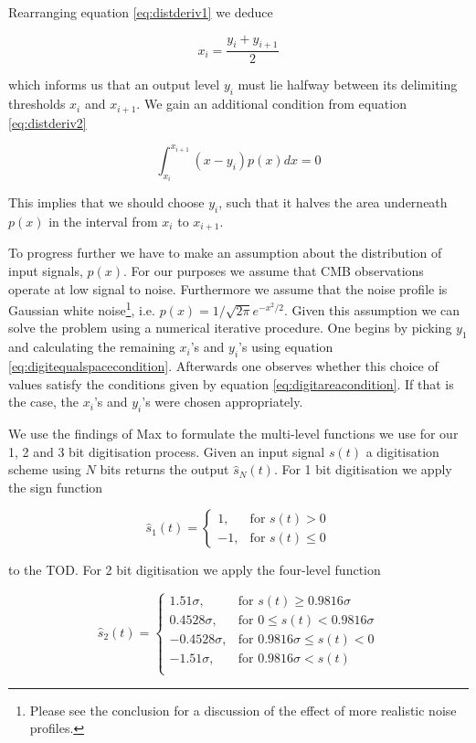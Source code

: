 \documentclass[apj]{emulateapj}
\begin{document}
Rearranging equation \ref{eq:distderiv1} we deduce

\begin{equation} \label{eq:digitequalspacecondition}
x_i = \frac{y_i+y_{i+1}}{2}
\end{equation}

which informs us that an output level $y_i$ must lie halfway between its delimiting thresholds $x_i$ and $x_{i+1}$. We gain an additional condition from equation \ref{eq:distderiv2}

\begin{equation} \label{eq:digitareacondition}
\int_{x_i}^{x_{i+1}} \left( x-y_i \right) p(x) dx = 0
\end{equation}

This implies that we should choose $y_i$, such that it halves the area underneath $p(x)$ in the interval from $x_i$ to $x_{i+1}$.

To progress further we have to make an assumption about the distribution of input signals, $p(x)$. For our purposes we assume that CMB observations operate at low signal to noise. Furthermore we assume that the noise profile is Gaussian white noise\footnote{Please see the conclusion for a discussion of the effect of more realistic noise profiles.}, i.e. $p(x) = 1/\sqrt{2\pi} e^{-x^2/2}$. Given this assumption we can solve the problem using a numerical iterative procedure. One begins by picking $y_1$ and calculating the remaining $x_i$'s and $y_i$'s using equation \ref{eq:digitequalspacecondition}. Afterwards one observes whether this choice of values satisfy the conditions given by equation \ref{eq:digitareacondition}. If that is the case, the $x_i$'s and $y_i$'s were chosen appropriately.

We use the findings of Max to formulate the multi-level functions we use for our 1, 2 and 3 bit digitisation process. Given an input signal $s(t)$ a digitisation scheme using $N$ bits returns the output $\hat{s}_N(t)$. For 1 bit digitisation we apply the sign function

\[ \hat{s}_1(t) = \left\{ \begin{array}{lr}
1, & \text{for } s(t) > 0\\
-1, & \text{for } s(t) \leq 0
\end{array} \right. \]

to the TOD. For 2 bit digitisation we apply the four-level function

\[ \hat{s}_2(t) = \left\{ \begin{array}{rl}
1.51 \sigma, & \text{for } s(t) \geq 0.9816 \sigma\\
0.4528 \sigma, & \text{for } 0 \leq s(t) < 0.9816 \sigma\\
-0.4528 \sigma, & \text{for } 0.9816 \sigma \leq s(t) < 0\\
-1.51 \sigma, & \text{for } 0.9816 \sigma < s(t)\\
\end{array} \right. \]
\end{document}
